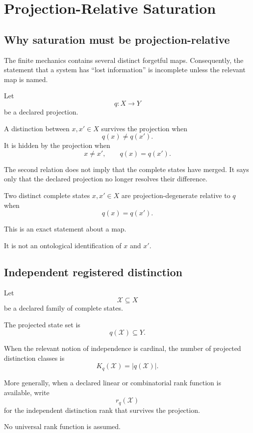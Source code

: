 \section{Projection-Relative Saturation}

\subsection{Why saturation must be projection-relative}

The finite mechanics contains several distinct forgetful maps.
Consequently, the statement that a system has ``lost information''
is incomplete unless the relevant map is named.

Let
\[
q:X\longrightarrow Y
\]
be a declared projection.

A distinction between \(x,x'\in X\) survives the projection when
\[
q(x)\neq q(x').
\]
It is hidden by the projection when
\[
x\neq x',
\qquad
q(x)=q(x').
\]

The second relation does not imply that the complete states have
merged.  It says only that the declared projection no longer resolves
their difference.

\begin{definition}
Two distinct complete states \(x,x'\in X\) are projection-degenerate
relative to \(q\) when
\[
q(x)=q(x').
\]
\end{definition}

This is an exact statement about a map.

It is not an ontological identification of \(x\) and \(x'\).

\subsection{Independent registered distinction}

Let
\[
\mathcal X\subseteq X
\]
be a declared family of complete states.

The projected state set is
\[
q(\mathcal X)\subseteq Y.
\]

When the relevant notion of independence is cardinal, the number of
projected distinction classes is
\[
K_q(\mathcal X)
=
|q(\mathcal X)|.
\]

More generally, when a declared linear or combinatorial rank function
is available, write
\[
r_q(\mathcal X)
\]
for the independent distinction rank that survives the projection.

No universal rank function is assumed.

